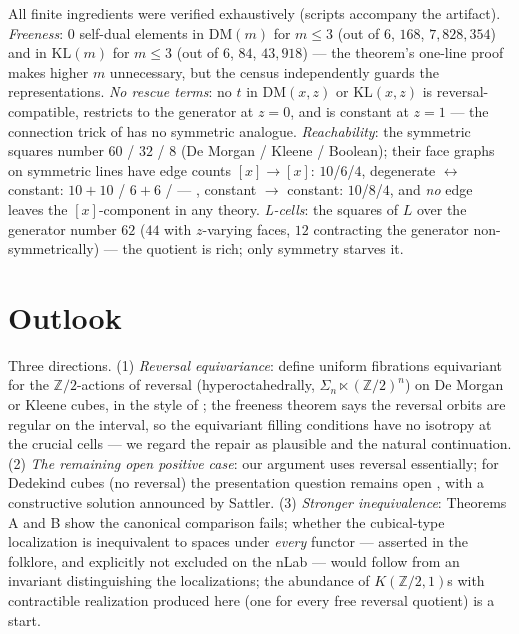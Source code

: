 \documentclass[11pt]{amsart}
\theoremstyle{definition}
\newcommand{\DM}{\mathrm{DM}}
\newcommand{\KL}{\mathrm{KL}}
\newcommand{\Ldash}{L}
\begin{document}
All finite ingredients were verified exhaustively (scripts
accompany the artifact).  \emph{Freeness}: $0$ self-dual elements
in $\DM(m)$ for $m \leq 3$ (out of $6$, $168$, $7{,}828{,}354$) and
in $\KL(m)$ for $m \leq 3$ (out of $6$, $84$, $43{,}918$) ---
the theorem's one-line proof makes higher $m$ unnecessary, but the
census independently guards the representations.  \emph{No rescue
terms}: no $t$ in $\DM(x,z)$ or $\KL(x,z)$ is
reversal-compatible, restricts to the generator at $z = 0$, and is
constant at $z = 1$ --- the connection trick of
\cite[Rem.~1]{CoqNote} has no symmetric analogue.
\emph{Reachability}: the symmetric squares number $60$ / $32$ / $8$
(De Morgan / Kleene / Boolean); their face graphs on symmetric
lines have edge counts $[x] \to [x]$: $10$/$6$/$4$, degenerate
$\leftrightarrow$ constant: $10{+}10$ / $6{+}6$ / --- , constant
$\to$ constant: $10$/$8$/$4$, and \emph{no} edge leaves the
$[x]$-component in any theory.  \emph{L-cells}: the squares of
$\Ldash$ over the generator number $62$ ($44$ with $z$-varying
faces, $12$ contracting the generator non-symmetrically) --- the
quotient is rich; only symmetry starves it.

\section{Outlook}
\label{sec:outlook}

Three directions.  (1) \emph{Reversal equivariance}: define uniform
fibrations equivariant for the $\mathbb{Z}/2$-actions of reversal
(hyperoctahedrally, $\Sigma_n \ltimes (\mathbb{Z}/2)^n$) on De
Morgan or Kleene cubes, in the style of \cite{ACCRS}; the freeness
theorem says the reversal orbits are regular on the interval, so
the equivariant filling conditions have no isotropy at the crucial
cells --- we regard the repair as plausible and the natural
continuation.  (2) \emph{The remaining open positive case}: our
argument uses reversal essentially; for Dedekind cubes (no
reversal) the presentation question remains open
\cite{StreicherWeinberger, CavalloSattlerElegance}, with a
constructive solution announced by Sattler.  (3) \emph{Stronger
inequivalence}: Theorems A and B show the canonical comparison
fails; whether the cubical-type localization is inequivalent to
spaces under \emph{every} functor --- asserted in the folklore, and
explicitly not excluded on the nLab --- would follow from an
invariant distinguishing the localizations; the abundance of
$K(\mathbb{Z}/2,1)$s with contractible realization produced here
(one for every free reversal quotient) is a start.
\end{document}

